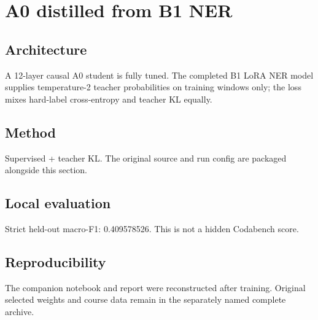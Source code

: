 \section{A0 distilled from B1 NER}
\subsection{Architecture}
A 12-layer causal A0 student is fully tuned. The completed B1 LoRA NER model supplies temperature-2 teacher probabilities on training windows only; the loss mixes hard-label cross-entropy and teacher KL equally.
\subsection{Method}
Supervised + teacher KL. The original source and run config are packaged alongside this section.
\subsection{Local evaluation}
Strict held-out macro-F1: 0.409578526. This is not a hidden Codabench score.
\subsection{Reproducibility}
The companion notebook and report were reconstructed after training. Original selected weights and course data remain in the separately named complete archive.
